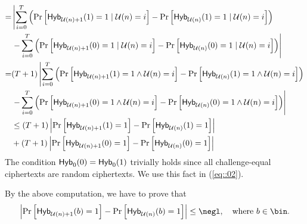 \documentclass{fundam}
\begin{document}
\begin{align}
	=&\left|  \sum_{i=0}^{T}  \left(  \Pr\left[   \tx{Hyb}_{\mathcal{U}(n)+1}(1)=1 \mid \mathcal{U}(n) = i \right]   -   \Pr\left[   \tx{Hyb}_{\mathcal{U}(n)}(1)=1 \mid \mathcal{U}(n) = i \right] \right) \right. \nonumber \\
	&\left. - \sum_{i=0}^{T}  \left(  \Pr\left[   \tx{Hyb}_{\mathcal{U}(n)+1}(0)=1 \mid \mathcal{U}(n) = i \right]   -   \Pr\left[   \tx{Hyb}_{\mathcal{U}(n)}(0)=1 \mid \mathcal{U}(n) = i \right] \right) \right| \label{eq::02} \\
	= & (T+1)\left|  \sum_{i=0}^{T}  \left(  \Pr\left[   \tx{Hyb}_{\mathcal{U}(n)+1}(1)=1 \land \mathcal{U}(n) = i \right]   -   \Pr\left[   \tx{Hyb}_{\mathcal{U}(n)}(1)=1 \land \mathcal{U}(n) = i \right] \right) \right. \nonumber\\ %
	&\left. - \sum_{i=0}^{T}  \left(  \Pr\left[   \tx{Hyb}_{\mathcal{U}(n)+1}(0)=1 \land \mathcal{U}(n) = i \right]   -   \Pr\left[   \tx{Hyb}_{\mathcal{U}(n)}(0)=1 \land \mathcal{U}(n) = i \right] \right) \right| \nonumber \\
	&\leq (T+1) \left|  \Pr\left[   \tx{Hyb}_{\mathcal{U}(n)+1}(1)=1\right] - \Pr\left[   \tx{Hyb}_{\mathcal{U}(n)}(1)=1  \right]  \right|  \nonumber \\
	&+  (T+1) \left|  \Pr\left[   \tx{Hyb}_{\mathcal{U}(n)+1}(0)=1\right] - \Pr\left[   \tx{Hyb}_{\mathcal{U}(n)}(0)=1  \right]  \right| \nonumber
\end{align}	
The condition $\mathsf{Hyb}_{0}(0)  =  \mathsf{Hyb}_{0}(1)$ trivially holds since all challenge-equal ciphertexts are random ciphertexts. We use this fact in (\ref{eq::02}). 

By the above computation, we have to prove that 
\begin{align*}
	\left|  \Pr\left[   \tx{Hyb}_{\mathcal{U}(n)+1}(b)=1\right] - \Pr\left[   \tx{Hyb}_{\mathcal{U}(n)}(b)=1  \right]  \right| \leq \negl, ~~~\text{where}~b\in\bin.
\end{align*} 
\end{document}
